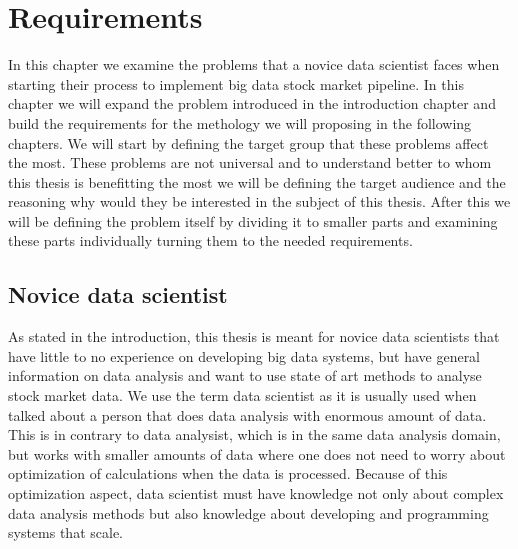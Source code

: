 \chapter{Requirements}
\label{chapter:problem}

In this chapter we examine the problems that a novice data scientist faces when starting their process to implement big data stock market pipeline.
In this chapter we will expand the problem introduced in the introduction chapter and build the requirements for the methology we will proposing in the following chapters.
We will start by defining the target group that these problems affect the most.
These problems are not universal and to understand better to whom this thesis is benefitting the most we will be defining the target audience and the reasoning why would they be interested in the subject of this thesis.
After this we will be defining the problem itself by dividing it to smaller parts and examining these parts individually turning them to the needed requirements.

\section{Novice data scientist}

As stated in the introduction, this thesis is meant for novice data scientists that have little to no experience on developing big data systems, but have general information on data analysis and want to use state of art methods to analyse stock market data.
We use the term data scientist as it is usually used when talked about a person that does data analysis with enormous amount of data.
This is in contrary to data analysist, which is in the same data analysis domain, but works with smaller amounts of data where one does not need to worry about optimization of calculations when the data is processed. \cite{voulgaris}
Because of this optimization aspect, data scientist must have knowledge not only about complex data analysis methods but also knowledge about developing and programming systems that scale.

